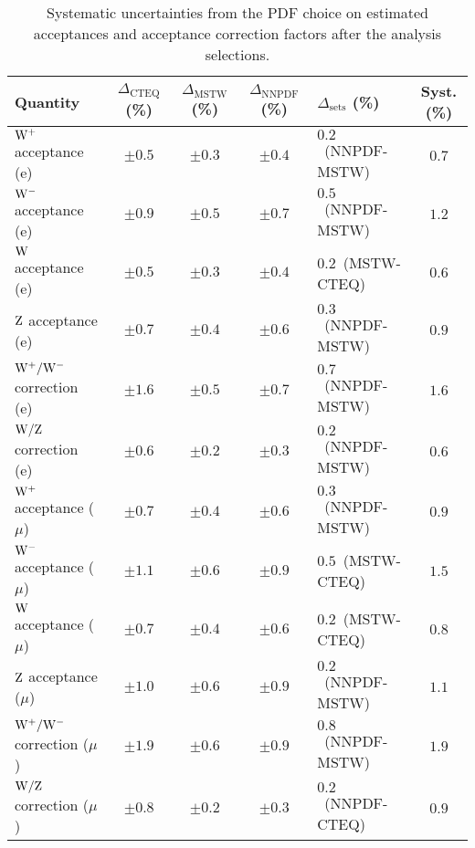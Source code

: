 \begin{table}[htb] %
\begin{center}
\caption{Systematic uncertainties from the PDF choice on estimated 
acceptances and acceptance correction factors after the analysis selections. }
\label{tab:pdfSyst}
\begin{tabular}{| l | c | c | c | l | c |}
\hline
\centering Quantity & $\Delta_{\mathrm{CTEQ}}$ (\%) & $\Delta_{\mathrm{MSTW}}$ (\%) &  $\Delta_{\mathrm{NNPDF}}$ (\%) & $\Delta_{\mathrm{sets}}$ (\%) & Syst. (\%) \\
\hline
\hline
$\mathrm{W^+}$ acceptance (e) & $\pm 0.5$ & $\pm 0.3$ &  $\pm 0.4$ & $0.2$~{\tiny (NNPDF-MSTW)} & $0.7$ \\
$\mathrm{W^-}$ acceptance (e) & $\pm 0.9$ & $\pm 0.5$ &  $\pm 0.7$ & $0.5$~{\tiny (NNPDF-MSTW)} & $1.2$ \\
$\mathrm{W}$ acceptance (e)   & $\pm 0.5$ & $\pm 0.3$ &  $\pm 0.4$ & $0.2$~{\tiny (MSTW-CTEQ)} & $0.6$ \\
$\mathrm{Z}$ acceptance (e)   & $\pm 0.7$ & $\pm 0.4$ &  $\pm 0.6$ & $0.3$~{\tiny (NNPDF-MSTW)} & $0.9$ \\
$\mathrm{W^+}/\mathrm{W^-}$ correction (e) & $\pm 1.6$ & $\pm 0.5$ &  $\pm 0.7$ & $0.7$~{\tiny (NNPDF-MSTW)} & $1.6$ \\
$\mathrm{W}/\mathrm{Z}$ correction (e) & $\pm 0.6$ & $\pm 0.2$ &  $\pm 0.3$ & $0.2$~{\tiny (NNPDF-MSTW)} & $0.6$ \\
\hline
$\mathrm{W^+}$ acceptance ($\mu$)   & $\pm 0.7$ & $\pm 0.4$ &  $\pm 0.6$ & $0.3$~{\tiny (NNPDF-MSTW)} & $0.9$ \\
$\mathrm{W^-}$ acceptance ($\mu$) & $\pm 1.1$ & $\pm 0.6$ &  $\pm 0.9$ & $0.5$~{\tiny (MSTW-CTEQ)} & $1.5$ \\
$\mathrm{W}$ acceptance ($\mu$) & $\pm 0.7$ & $\pm 0.4$ &  $\pm 0.6$ & $0.2$~{\tiny (MSTW-CTEQ)} & $0.8$ \\
$\mathrm{Z}$ acceptance ($\mu$)   & $\pm 1.0$ & $\pm 0.6$ &  $\pm 0.9$ & $0.2$~{\tiny (NNPDF-MSTW)} & $1.1$ \\
$\mathrm{W^+}/\mathrm{W^-}$ correction ($\mu$) & $\pm 1.9$ & $\pm 0.6$ &  $\pm 0.9$ & $0.8$~{\tiny (NNPDF-MSTW)} & $1.9$ \\
$\mathrm{W}/\mathrm{Z}$ correction ($\mu$) & $\pm 0.8$ & $\pm 0.2$ &  $\pm 0.3$ & $0.2$~{\tiny (NNPDF-CTEQ)} & $0.9$ \\
\hline
\end{tabular}
\end{center}
\end{table}

